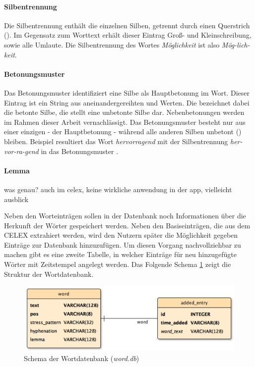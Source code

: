 \paragraph{Silbentrennung}
Die Silbentrennung enthält die einzelnen Silben, getrennt durch einen Querstrich (\qq{-}). Im Gegensatz zum Worttext erhält dieser Eintrag Groß- und Kleinschreibung, sowie alle Umlaute. Die Silbentrennung des Wortes \textit{Möglichkeit} ist also \textit{Mög-lich-keit}.

\paragraph{Betonungsmuster}
Das Betonungsmuster identifiziert eine Silbe als Hauptbetonung im Wort. Dieser Eintrag ist ein String aus aneinandergereihten  und  Werten. Die  bezeichnet dabei die betonte Silbe, die  stellt eine unbetonte Silbe dar. Nebenbetonungen werden im Rahmen dieser Arbeit vernachlässigt. Das Betonungsmuster besteht nur aus einer einzigen  - der Hauptbetonung - während alle anderen Silben unbetont () bleiben. Beispiel resultiert das Wort \textit{hervorragend} mit der Silbentrennung \textit{her-vor-ra-gend} in das Betonungsmuster .

\paragraph{Lemma}
was genau? auch im celex, keine wirkliche anwendung in der app, vielleicht ausblick

Neben den Worteinträgen sollen in der Datenbank noch Informationen über die Herkunft der Wörter gespeichert werden. Neben den Basiseinträgen, die aus dem CELEX extrahiert werden, wird den Nutzern später die Möglichkeit gegeben Einträge zur Datenbank hinzuzufügen. Um diesen Vorgang nachvollziehbar zu machen gibt es eine zweite Tabelle, in welcher Einträge für neu hinzugefügte Wörter mit Zeitstempel angelegt werden. Das Folgende Schema \ref{figure:worddatabase} zeigt die Struktur der Wortdatenbank.

\begin{figure}[h!]
	\centering
	\includegraphics[width=.6\linewidth]{figures/worddb}
	\caption{Schema der Wortdatenbank (\textit{word.db})}
	\label{figure:worddatabase}
\end{figure}

